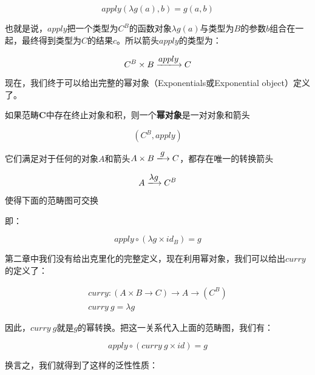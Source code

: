 \documentclass{article}
\begin{document}
\[
apply(\lambda g(a), b) = g(a, b)
\]

也就是说，$apply$把一个类型为$C^B$的函数对象$\lambda g(a)$与类型为$B$的参数$b$组合在一起，最终得到类型为$C$的结果$c$。所以箭头$apply$的类型为：

\[
C^B \times B \arrowto{apply} C
\]

现在，我们终于可以给出完整的幂对象（Exponentials或Exponential object）定义了。

\begin{definition}
如果范畴$\pmb{C}$中存在终止对象和积，则一个\textbf{幂对象}是一对对象和箭头

\[
(C^B, apply)
\]

它们满足对于任何的对象$A$和箭头$A \times B \arrowto{g} C$，都存在唯一的转换箭头

\[
 A \arrowto{\lambda g} C^B
\]

使得下面的范畴图可交换

\begin{center}
\end{center}

即：

\[
  apply \circ (\lambda g \times id_B) = g
\]

\end{definition}

第二章中我们没有给出克里化的完整定义，现在利用幂对象，我们可以给出$curry$的定义了：

\[
\begin{array}{l}
curry : (A \times B \to C) \to A \to (C^B) \\
curry\ g = \lambda g
\end{array}
\]

因此，$curry\ g$就是$g$的幂转换。把这一关系代入上面的范畴图，我们有：

\[
  apply \circ (curry\ g \times id) = g
\]

换言之，我们就得到了这样的泛性性质：
\end{document}

